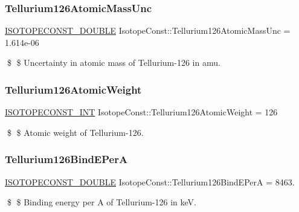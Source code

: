 \subsubsection{\texorpdfstring{Tellurium126\+Atomic\+Mass\+Unc}{Tellurium126AtomicMassUnc}}
{\footnotesize\ttfamily \mbox{\hyperlink{group___isotope_const-_macros_ga8f45a7272ce02c0b4c65c44636ed719a}{I\+S\+O\+T\+O\+P\+E\+C\+O\+N\+S\+T\+\_\+\+D\+O\+U\+B\+LE}} Isotope\+Const\+::\+Tellurium126\+Atomic\+Mass\+Unc = 1.\+614e-\/06}

\$ \$ Uncertainty in atomic mass of Tellurium-\/126 in amu. \mbox{\label{group___isotope_const-_tellurium-_te126_gaf6497a7cd9607f76f1c58f45d278cb8c}} 
\subsubsection{\texorpdfstring{Tellurium126\+Atomic\+Weight}{Tellurium126AtomicWeight}}
{\footnotesize\ttfamily \mbox{\hyperlink{group___isotope_const-_macros_ga5f18360b3e99483a35c32d789e62621c}{I\+S\+O\+T\+O\+P\+E\+C\+O\+N\+S\+T\+\_\+\+I\+NT}} Isotope\+Const\+::\+Tellurium126\+Atomic\+Weight = 126}

\$ \$ Atomic weight of Tellurium-\/126. \mbox{\label{group___isotope_const-_tellurium-_te126_ga4a7377e3067a2237496de3bc8e30189c}} 
\subsubsection{\texorpdfstring{Tellurium126\+Bind\+E\+PerA}{Tellurium126BindEPerA}}
{\footnotesize\ttfamily \mbox{\hyperlink{group___isotope_const-_macros_ga8f45a7272ce02c0b4c65c44636ed719a}{I\+S\+O\+T\+O\+P\+E\+C\+O\+N\+S\+T\+\_\+\+D\+O\+U\+B\+LE}} Isotope\+Const\+::\+Tellurium126\+Bind\+E\+PerA = 8463.}

\$ \$ Binding energy per A of Tellurium-\/126 in keV. \mbox{\label{group___isotope_const-_tellurium-_te126_ga2b37da3eccd0af9fdeb055d570f894a4}} 

